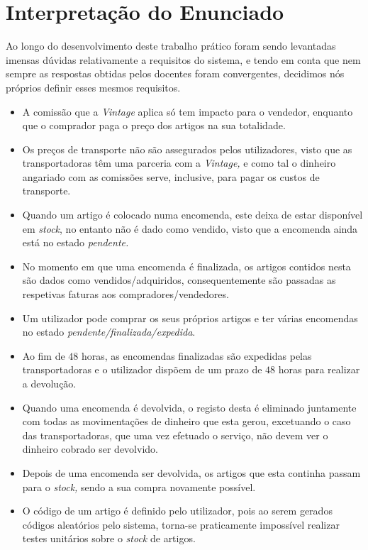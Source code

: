 \chapter{Interpretação do Enunciado}

    Ao longo do desenvolvimento deste trabalho prático foram sendo levantadas imensas dúvidas relativamente a requisitos do sistema, e tendo em conta que nem sempre as respostas obtidas pelos docentes foram convergentes, decidimos nós próprios definir esses mesmos requisitos.

    \begin{itemize}

        \item A comissão que a \textit{Vintage} aplica só tem impacto para o vendedor, enquanto que o comprador paga o preço dos artigos na sua totalidade.

        \item Os preços de transporte não são assegurados pelos utilizadores, visto que as transportadoras têm uma parceria com a \textit{Vintage,} e como tal o dinheiro angariado com as comissões serve, inclusive, para pagar os custos de transporte.
        
        \item Quando um artigo é colocado numa encomenda, este deixa de estar disponível em \textit{stock}, no entanto não é dado como vendido, visto que a encomenda ainda está no estado \textit{pendente.}

        \item No momento em que uma encomenda é finalizada, os artigos contidos nesta são dados como vendidos/adquiridos, consequentemente são passadas as respetivas faturas aos compradores/vendedores.

        \item Um utilizador pode comprar os seus próprios artigos e ter várias encomendas no estado \textit{pendente/finalizada/expedida}.

        \item Ao fim de $48$ horas, as encomendas finalizadas são expedidas pelas transportadoras e o utilizador dispõem de um prazo de $48$ horas para realizar a devolução.

        \item Quando uma encomenda é devolvida, o registo desta é eliminado juntamente com todas as movimentações de dinheiro que esta gerou, excetuando o caso das transportadoras, que uma vez efetuado o serviço, não devem ver o dinheiro cobrado ser devolvido.

        \item Depois de uma encomenda ser devolvida, os artigos que esta continha passam para o \textit{stock,} sendo a sua compra novamente possível.

        \item O código de um artigo é definido pelo utilizador, pois ao serem gerados códigos aleatórios pelo sistema, torna-se praticamente impossível realizar testes unitários sobre o \textit{stock} de artigos. 

    \end{itemize}